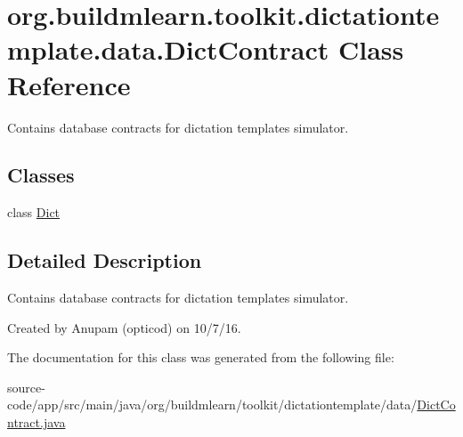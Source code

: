 \hypertarget{classorg_1_1buildmlearn_1_1toolkit_1_1dictationtemplate_1_1data_1_1DictContract}{}\section{org.\+buildmlearn.\+toolkit.\+dictationtemplate.\+data.\+Dict\+Contract Class Reference}
\label{classorg_1_1buildmlearn_1_1toolkit_1_1dictationtemplate_1_1data_1_1DictContract}


Contains database contracts for dictation template\textquotesingle{}s simulator.  


\subsection*{Classes}
\begin{DoxyCompactItemize}
\item 
class \hyperlink{classorg_1_1buildmlearn_1_1toolkit_1_1dictationtemplate_1_1data_1_1DictContract_1_1Dict}{Dict}
\end{DoxyCompactItemize}


\subsection{Detailed Description}
Contains database contracts for dictation template\textquotesingle{}s simulator. 

Created by Anupam (opticod) on 10/7/16. 

The documentation for this class was generated from the following file\+:\begin{DoxyCompactItemize}
\item 
source-\/code/app/src/main/java/org/buildmlearn/toolkit/dictationtemplate/data/\hyperlink{DictContract_8java}{Dict\+Contract.\+java}\end{DoxyCompactItemize}
